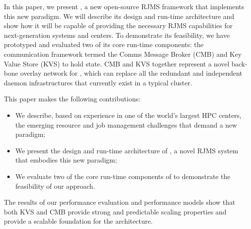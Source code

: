 In this paper, we present \flux, a new open-source RJMS framework that implements 
this new paradigm. We will describe
its design and run-time architecture and show how it will be capable of providing
the necessary RJMS capabilities for next-generation systems and centers. To
demonstrate its feasibility, we have prototyped and evaluated two of its core run-time components:
%
%
%
the communication framework termed the Comms Message Broker (CMB)
and Key Value Store (KVS) to hold \flux state.
%
%
CMB and KVS together represent a novel back-bone overlay network for \flux,
which can replace all the redundant and independent
daemon infrastructures that currently exist in a typical cluster.

This paper makes the following contributions:
\begin{itemize}
\item{We describe, based on experience in one of the world's largest HPC centers, the emerging resource and job management challenges that demand a new paradigm;}
\item{We present the design and run-time architecture of \flux, a novel RJMS system that embodies this new paradigm;}
\item{We evaluate two of the core run-time components of \flux to demonstrate the feasibility of our approach.}
\end{itemize}

The results of our performance evaluation 
and performance models show that both KVS and CMB provide 
strong and predictable scaling properties and provide a scalable foundation 
for the \flux architecture.

